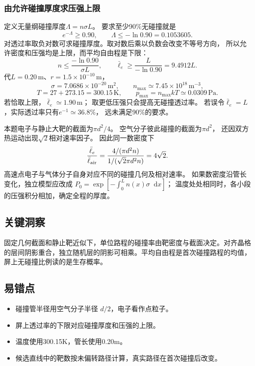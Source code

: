 \documentclass[UTF8,fontset=fandol,a4paper,11pt]{ctexart}
\newcommand{\dd}{\mathop{}\!\mathrm{d}}
\begin{document}
\subsubsection*{由允许碰撞厚度求压强上限}
定义无量纲碰撞厚度$\Lambda=n\sigma L$。
要求至少90\%无碰撞就是
\[
e^{-\Lambda}\ge0.90,\qquad
\Lambda\le-\ln0.90=0.1053605.
\]
对透过率取负对数可求碰撞厚度。取对数后乘以负数会改变不等号方向，
所以允许密度和压强均是上限，而平均自由程是下限：
\[
n\le\frac{-\ln0.90}{\sigma L},\qquad
\bar\ell_e\ge\frac{L}{-\ln0.90}=9.4912L.
\]
代$L=0.20\,\mathrm m$、$r=1.5\times10^{-10}\,\mathrm m$，
\[
\sigma=7.0686\times10^{-20}\,\mathrm{m^2},\qquad
n_{\max}\simeq7.45\times10^{18}\,\mathrm{m^{-3}},
\]
\[
T=27+273.15=300.15\,\mathrm K,\qquad
p_{\max}=n_{\max}kT\simeq0.0309\,\mathrm{Pa}.
\]
若恰取上限，$\bar\ell_e\simeq1.90\,\mathrm m$；
取更低压强只会提高无碰撞透过率。
若误令$\bar\ell_e=L$，实际透过率只有$e^{-1}\simeq36.8\%$，
远未满足90\%的要求。

本题电子与静止大靶的截面为$\pi d^2/4$。
空气分子彼此碰撞的截面为$\pi d^2$，
还因双方热运动出现$\sqrt2$相对速率因子。
因此同一数密度下
\[
\frac{\bar\ell_e}{\bar\ell_{\rm air}}
=\frac{4/(\pi d^2n)}{1/(\sqrt2\pi d^2n)}
=4\sqrt2.
\]
高速点电子与气体分子自身对应不同的碰撞几何及相对速率。
如果数密度沿管长变化，独立模型应改成
$P_0=\exp[-\int_0^L n(x)\sigma\dd x]$；
温度处处相同时，各小段的压强积分相加，确定全程的厚度。




\subsection*{关键洞察}

固定几何截面和静止靶近似下，单位路程的碰撞率由靶密度与截面决定。对齐晶格的层间阴影重合，独立随机层的阴影可相乘。平均自由程是首次碰撞路程的均值，屏上无碰撞比例读的是生存概率。



\subsection*{易错点}

\begin{itemize}
\item 碰撞管半径用空气分子半径 $d/2$，电子看作点粒子。
\item 屏上透过率的下限对应碰撞厚度和压强的上限。
\item 温度使用300.15K，管长使用0.20m。
\item 候选直线中的靶数按未偏转路径计算，真实路径在首次碰撞后改变。
\end{itemize}
\end{document}
